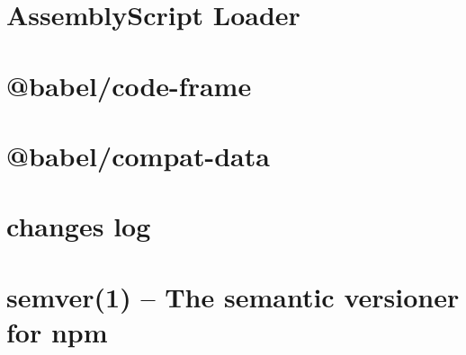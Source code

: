 \documentclass[twoside]{book}
\newcommand{\+}{\discretionary{\mbox{\scriptsize$\hookleftarrow$}}{}{}}
\begin{document}
\chapter{Assembly\+Script Loader}
\label{md__c___users_vaishnavi_jadhav__desktop__developer_code_mean_stack_example_client_node_modules__45a469ba890410654419841d1e838053}

\chapter{@babel/code-\/frame}
\label{md__c___users_vaishnavi_jadhav__desktop__developer_code_mean_stack_example_client_node_modules__babel_code_frame__r_e_a_d_m_e}

\chapter{@babel/compat-\/data}
\label{md__c___users_vaishnavi_jadhav__desktop__developer_code_mean_stack_example_client_node_modules__babel_compat_data__r_e_a_d_m_e}

\chapter{changes log}
\label{md__c___users_vaishnavi_jadhav__desktop__developer_code_mean_stack_example_client_node_modules__5b0ec0817868d2f2a8df7ec287104162}

\chapter{semver(1) -- The semantic versioner for npm}
\label{md__c___users_vaishnavi_jadhav__desktop__developer_code_mean_stack_example_client_node_modules__5baecf4a9bfd941a207576e767be0d29}

\end{document}
